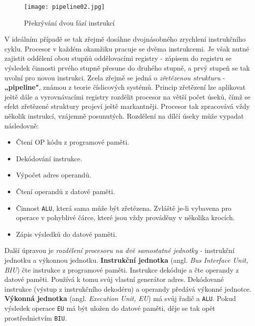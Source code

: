      \begin{figure}[ht!] %
        \centering
        \texttt{[image: pipeline02.jpg]}
        \caption{Překrývání dvou fází instrukcí}
        \label{MIT:fig_pipeline02}
      \end{figure}     

      V ideálním případě se tak zřejmě dosáhne dvojnásobného zrychlení instrukčního cyklu. Procesor 
      v každém okamžiku pracuje se dvěma instrukcemi. Je však nutné zajistit oddělení obou stupňů 
      oddělovacími registry - zápisem do registru se výsledek činnosti prvého stupně přesune do 
      druhého stupně, a prvý stupeň se tak uvolní pro novou instrukci. Zcela zřejmě se jedná o 
      \emph{zřetězenou strukturu} - \textbf{„pipeline"}, známou z teorie číslicových systémů. 
      Princip zřetězení lze aplikovat ještě dále a vyrovnávacími registry rozdělit procesor na 
      větší počet úseků, čímž se efekt zřetězené struktury projeví ještě markantněji. Procesor tak 
      zpracovává vždy několik instrukcí, vzájemně posunutých. Rozdělení na dílčí úseky může vypadat 
      následovně:
      \begin{itemize}\addtolength{\itemsep}{-0.5\baselineskip}
        \item Čtení OP kódu z programové paměti.
        \item Dekódování instrukce.
        \item Výpočet adres operandů.
        \item Čtení operandů z datové paměti.
        \item Činnost \texttt{ALU}, která sama může být zřetězena. Zvláště je-li vybavena pro  
              operace v pohyblivé čárce, které jsou vždy prováděny v několika krocích.
        \item Zápis výsledků do datové paměti.
      \end{itemize}
      
      Další úpravou je \emph{rozdělení procesoru na dvě samostatné jednotky} - instrukční jednotku 
      a výkonnou jednotku. \textbf{Instrukční jednotka} (angl. \emph{Bus Interface Unit, BIU}) čte 
      instrukce z programové paměti. Instrukce dekóduje a čte operandy z datové paměti. Používá k 
      tomu svůj vlastní generátor adres. Dekódované instrukce (výstup z instrukčního dekodéru) a 
      operandy předává výkonné jednotce. \textbf{Výkonná jednotka} (angl. \emph{Execution Unit, 
      EU}) má svůj řadič a \texttt{ALU}. Pokud výsledek operace \texttt{EU} má být uložen do datové 
      paměti, děje se tak opět prostřednictvím \texttt{BIU}. 
      
